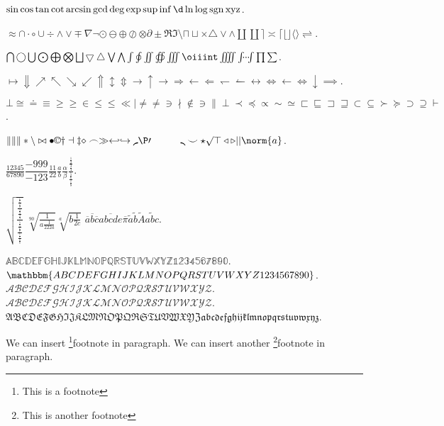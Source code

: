 \documentclass{ctexbook}
\DeclareMathOperator{\sgn}{sgn}
\begin{document}
\(\sin \cos \tan \cot \arcsin \gcd \deg \exp \sup \inf \d \ln \log \sgn \operatorname{xyz}\).

\(\approx \cap \cdot \circ \cup \div \land \lor \mp \nabla \neg \odot \ominus \oplus \oslash \otimes \partial \pm \Re \Im \setminus \sqcap \sqcup \times \triangle \vee \wedge \amalg \coprod \rceil \asymp \lceil \lfloor \rfloor \langle \rangle \rightleftharpoons \).

\(\bigcap \bigcirc \bigcup \bigodot \bigoplus \bigotimes \bigsqcup \bigtriangledown \bigtriangleup \bigvee \bigwedge \int \oint \iint \oiint \iiint \oiiint \iiiint \idotsint \prod \sum \).

\(\mapsto \Downarrow \nearrow \nwarrow \searrow \swarrow \Uparrow \updownarrow \Updownarrow \to \uparrow \rightarrow \Rightarrow \leftarrow \Leftarrow \leftharpoondown \leftharpoonup \leftrightarrow \Leftrightarrow \gets \iff \downarrow \implies\).

\(\bot \cong \doteq \equiv \ge \geq \in \le \leq \ll \mid \ne \neq \ni \nmid \notin \owns \parallel \perp \prec \preceq \propto \sim \simeq \sqsubset \sqsubseteq \sqsupset \sqsupseteq \subset \subseteq \succ \succeq \supset \supseteq \vdash \).

\(\| \lVert \rVert \ast \backslash \bowtie \bullet \copyright \dagger \dashv \ddagger \diamond \frown \gg \hookleftarrow \hookrightarrow \lmoustache \P \prime \quad \qquad \rmoustache \smile \star \surd \top \triangleleft \triangleright \lvert \rvert \norm{a}\).

\(\frac{12345}{67890} \dfrac{-999}{-123} \tfrac{11}{22} \frac{a}{b} \frac{\alpha}{\beta} \frac{\frac{\frac{1}{2}}{\frac{3}{4}}}{\frac{\frac{5}{6}}{\frac{7}{8}}}\).

\(\sqrt{\frac{\frac{\frac{\frac{1}{1}}{\frac{2}{2}}}{\frac{\frac{3}{3}}{\frac{4}{4}}}}{\frac{\frac{\frac{5}{5}}{\frac{6}{6}}}{\frac{\frac{7}{7}}{\frac{8}{8}}}}}\)
\(\sqrt[90]{\frac{1}{a \frac{1}{222a}}}  \sqrt[a]{b \frac{1}{2c} } \)
\(\overline{a} \overline{b} \overline{c} \overline{abcde}  \overline{\pi} \tilde{a} \tilde{b} \tilde{A} \tilde{abc} \).

\(\mathbb{ABCDEFGHIJKLMNOPQRSTUVWXYZ1234567890} \).
\(\mathbbm{ABCDEFGHIJKLMNOPQRSTUVWXYZ1234567890} \).
\(\mathcal{ABCDEFGHIJKLMNOPQRSTUVWXYZ}\).
\(\mathscr{ABCDEFGHIJKLMNOPQRSTUVWXYZ}\).
\(\mathfrak{ABCDEFGHIJKLMNOPQRSTUVWXYZabcdefghijklmnopqrstuvwxyz}\).

We can insert \footnote{This is a footnote}{footnote} in paragraph.
We can insert another \footnote{This is another footnote}{footnote} in paragraph.
\end{document}
